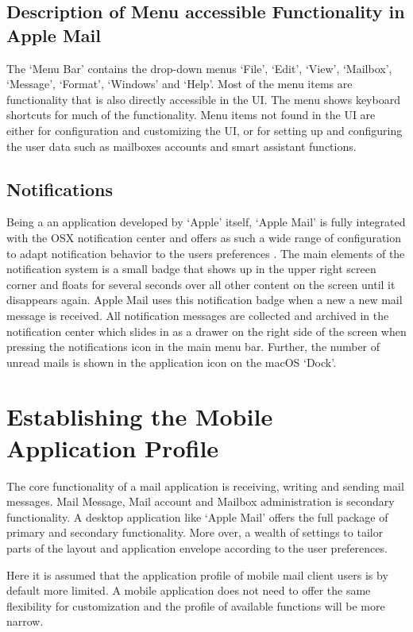 \documentclass[a4paper,11pt,twoside]{article}
\begin{document}
\subsection{Description of Menu accessible Functionality in Apple Mail}
The `Menu Bar' contains the drop-down menus `File', `Edit', `View', `Mailbox',
`Message', `Format', `Windows' and `Help'. Most of the menu items are functionality
that is also directly accessible in the UI. The menu shows keyboard shortcuts for
much of the functionality. Menu items not found in the UI are either for
configuration and customizing the UI, or for setting up and configuring the user
data such as mailboxes accounts and smart assistant functions.

\subsection{Notifications}
Being a an application developed by `Apple' itself, `Apple Mail' is fully integrated
with the OSX notification center and offers as such a wide range of configuration to
adapt notification behavior to the users preferences \cite{apple_notifications}. The
main elements of the notification system is a small badge that shows up in the upper
right screen corner and floats for several seconds over all other content on the
screen until it disappears again. Apple Mail uses this notification badge when a
new a new mail message is received. All notification messages are collected and
archived in the notification center which slides in as a drawer on the right side
of the screen when pressing the notifications icon in the main menu bar. Further,
the number of unread mails is shown in the application icon on the macOS `Dock'.

\section{Establishing the Mobile Application Profile}
The core functionality of a mail application is receiving, writing and sending
mail messages. Mail Message, Mail account and Mailbox administration is
secondary functionality. A desktop application like `Apple Mail' offers the
full package of primary and secondary functionality. More over, a wealth of
settings to tailor parts of the layout and application envelope according to the
user preferences.

Here it is assumed that the application profile of mobile
mail client users is by default more limited. A mobile application does not need
to offer the same flexibility for customization and the profile of available
functions will be more narrow.
\end{document}
